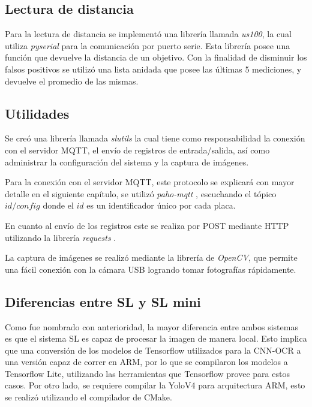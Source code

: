 \subsection{Lectura de distancia}

Para la lectura de distancia se implementó una librería llamada \textit{us100}, la cual utiliza \textit{pyserial}  \cite{noauthor_documentacion_nodate-1} para la comunicación por puerto serie.
Esta librería posee una función que devuelve la distancia de un objetivo. Con la finalidad de disminuir los falsos positivos se utilizó una lista anidada que posee las últimas 5 mediciones, y devuelve el promedio de las mismas.

\subsection{Utilidades}

Se creó una librería llamada \textit{slutils} la cual tiene como responsabilidad la conexión con el servidor MQTT, el envío de registros de entrada/salida, así como administrar la configuración del sistema y la captura de imágenes.

Para la conexión con el servidor MQTT, este protocolo se explicará con mayor detalle en el siguiente capítulo, se utilizó \textit{paho-mqtt} \cite{craggs_documentacion_nodate}, escuchando el tópico \textit{$id/config$} donde el $id$ es un identificador único por cada placa.

En cuanto al envío de los registros este se realiza por POST mediante HTTP utilizando la librería \textit{requests} \cite{python_software_foundation_documentacion_nodate}.

La captura de imágenes se realizó mediante la librería de \textit{OpenCV}, que permite una fácil conexión con la cámara USB logrando tomar fotografías rápidamente.

\subsection{Diferencias entre SL y SL mini}

Como fue nombrado con anterioridad, la mayor diferencia entre ambos sistemas es que el sistema SL es capaz de procesar la imagen de manera local. Esto implica que una conversión de los modelos de Tensorflow \cite{google_tensorflow_nodate} utilizados para la CNN-OCR a una versión capaz de correr en ARM, por lo que se compilaron los modelos a Tensorflow Lite, utilizando las herramientas que Tensorflow provee para estos casos. Por otro lado, se requiere compilar la YoloV4 para arquitectura ARM, esto se realizó utilizando el compilador de CMake.

